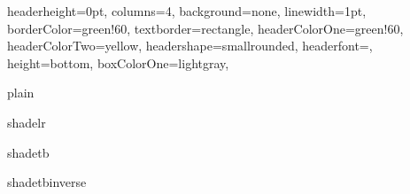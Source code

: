 \documentclass[portrait,fontscale=1,margin=0.2cm,paperwidth=15truecm, paperheight=1.5cm,debug]{baposter}
\begin{document}
\begin{poster}{
  headerheight=0pt,
  columns=4,
  background=none,
  linewidth=1pt,
  borderColor=green!60,
  textborder=rectangle,
  headerColorOne=green!60,
  headerColorTwo=yellow,
  headershape=smallrounded,
  headerfont={},
  height=bottom,
  boxColorOne=lightgray,
}{}{}{}{}

\begin{posterbox}[column=0,headerfont={},headershade=plain]{plain}
\end{posterbox}

\begin{posterbox}[column=1,headerfont={},headershade=shadelr]{shadelr}
\end{posterbox}

\begin{posterbox}[column=2,headerfont={},headershade=shadetb]{shadetb}
\end{posterbox}

\begin{posterbox}[column=3,headerfont={},headershade=shadetbinverse]{shadetbinverse}
\end{posterbox}

\end{poster}
\end{document}

